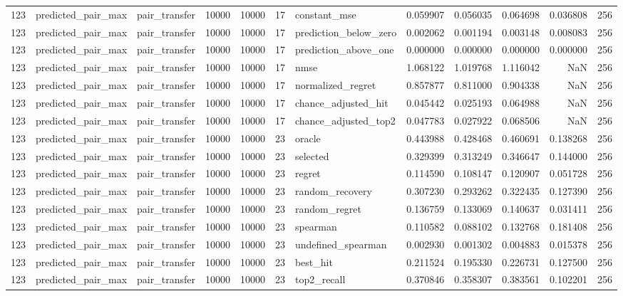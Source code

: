 \begin{tabular}{rllrrrlrrrrr}
123 & predicted_pair_max & pair_transfer & 10000 & 10000 & 17 & constant_mse & 0.059907 & 0.056035 & 0.064698 & 0.036808 & 256 \\
123 & predicted_pair_max & pair_transfer & 10000 & 10000 & 17 & prediction_below_zero & 0.002062 & 0.001194 & 0.003148 & 0.008083 & 256 \\
123 & predicted_pair_max & pair_transfer & 10000 & 10000 & 17 & prediction_above_one & 0.000000 & 0.000000 & 0.000000 & 0.000000 & 256 \\
123 & predicted_pair_max & pair_transfer & 10000 & 10000 & 17 & nmse & 1.068122 & 1.019768 & 1.116042 & NaN & 256 \\
123 & predicted_pair_max & pair_transfer & 10000 & 10000 & 17 & normalized_regret & 0.857877 & 0.811000 & 0.904338 & NaN & 256 \\
123 & predicted_pair_max & pair_transfer & 10000 & 10000 & 17 & chance_adjusted_hit & 0.045442 & 0.025193 & 0.064988 & NaN & 256 \\
123 & predicted_pair_max & pair_transfer & 10000 & 10000 & 17 & chance_adjusted_top2 & 0.047783 & 0.027922 & 0.068506 & NaN & 256 \\
123 & predicted_pair_max & pair_transfer & 10000 & 10000 & 23 & oracle & 0.443988 & 0.428468 & 0.460691 & 0.138268 & 256 \\
123 & predicted_pair_max & pair_transfer & 10000 & 10000 & 23 & selected & 0.329399 & 0.313249 & 0.346647 & 0.144000 & 256 \\
123 & predicted_pair_max & pair_transfer & 10000 & 10000 & 23 & regret & 0.114590 & 0.108147 & 0.120907 & 0.051728 & 256 \\
123 & predicted_pair_max & pair_transfer & 10000 & 10000 & 23 & random_recovery & 0.307230 & 0.293262 & 0.322435 & 0.127390 & 256 \\
123 & predicted_pair_max & pair_transfer & 10000 & 10000 & 23 & random_regret & 0.136759 & 0.133069 & 0.140637 & 0.031411 & 256 \\
123 & predicted_pair_max & pair_transfer & 10000 & 10000 & 23 & spearman & 0.110582 & 0.088102 & 0.132768 & 0.181408 & 256 \\
123 & predicted_pair_max & pair_transfer & 10000 & 10000 & 23 & undefined_spearman & 0.002930 & 0.001302 & 0.004883 & 0.015378 & 256 \\
123 & predicted_pair_max & pair_transfer & 10000 & 10000 & 23 & best_hit & 0.211524 & 0.195330 & 0.226731 & 0.127500 & 256 \\
123 & predicted_pair_max & pair_transfer & 10000 & 10000 & 23 & top2_recall & 0.370846 & 0.358307 & 0.383561 & 0.102201 & 256 \\

\end{tabular}
